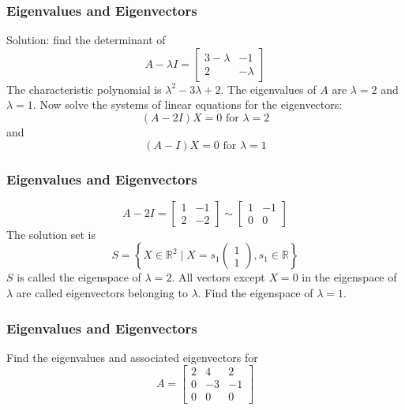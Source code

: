 \documentclass[xcolor=dvipsnames]{beamer}
\begin{document}
\begin{frame}
  \frametitle{Eigenvalues and Eigenvectors}
  Solution: find the determinant of
  \begin{equation}
    \label{eq:aeboapai}
    A-\lambda{}I=\left[
      \begin{array}{cc}
        3-\lambda&-1\\
        2&-\lambda
      \end{array}\right]
  \end{equation}
The characteristic polynomial is $\lambda^{2}-3\lambda+2$. The
eigenvalues of $A$ are $\lambda=2$ and $\lambda=1$. Now solve the
systems of linear equations for the eigenvectors:
\begin{equation}
  \label{eq:ahquaiwi}
  (A-2I)X=0\mbox{ for }\lambda=2
\end{equation}
and
\begin{equation}
  \label{eq:eetoodai}
  (A-I)X=0\mbox{ for }\lambda=1
\end{equation}
\end{frame}

\begin{frame}
  \frametitle{Eigenvalues and Eigenvectors}
  \begin{equation}
    \label{eq:jaegheed}
    A-2I=\left[
      \begin{array}{cc}
        1&-1\\
        2&-2
      \end{array}\right]\sim\left[
      \begin{array}{cc}
        1&-1\\
        0&0
      \end{array}\right]
  \end{equation}
  The solution set is
  \begin{equation}
    \label{eq:enahvodo}
S=\left\{X\in\mathbb{R}^{2}\;|\;X=s_{1}\left(
    \begin{array}{c}
      1\\
      1
    \end{array}\right),s_{1}\in\mathbb{R}\right\}
\end{equation}
$S$ is called the \alert{eigenspace} of $\lambda=2$. All vectors
except $X=0$ in the eigenspace of $\lambda$ are called eigenvectors
belonging to $\lambda$. Find the eigenspace of $\lambda=1$.
\end{frame}

\begin{frame}
  \frametitle{Eigenvalues and Eigenvectors}
  {\ubung} Find the eigenvalues and associated eigenvectors for
  \begin{equation}
    \label{eq:liezaiba}
    A=\left[
      \begin{array}{ccc}
        2&4&2 \\
        0&-3&-1 \\
        0&0&0
      \end{array}\right]
  \end{equation}
\end{frame}
\end{document}
